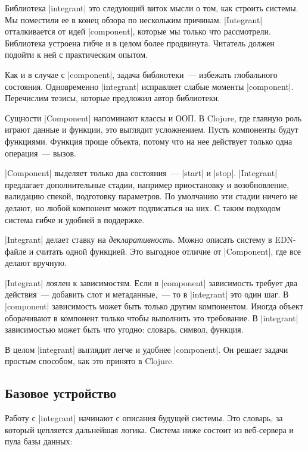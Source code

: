 Библиотека \spverb|integrant|
это следующий виток мысли о том, как строить системы. Мы поместили ее в конец
обзора по нескольким причинам. \spverb|Integrant| отталкивается от идей
\spverb|component|, которые мы только что рассмотрели. Библиотека устроена гибче
и в целом более продвинута. Читатель должен подойти к ней с практическим опытом.

Как и в случае с \spverb|component|, задача библиотеки~--- избежать глобального
состояния. Одновременно \spverb|integrant| исправляет слабые моменты
\spverb|component|. Перечислим тезисы, которые предложил автор библиотеки.

Сущности \spverb|Component| напоминают классы и ООП. В Clojure, где главную роль
играют данные и функции, это выглядит усложнением. Пусть компоненты будут
функциями. Функция проще объекта, потому что на нее действует только одна
операция~--- вызов.

\spverb|Component| выделяет только два состояния~--- \spverb|start| и
\spverb|stop|. \spverb|Integrant| предлагает дополнительные стадии, например
приостановку и возобновление, валидацию спекой, подготовку параметров. По
умолчанию эти стадии ничего не делают, но любой компонент может подписаться на
них. С таким подходом система гибче и удобней в поддержке.

\spverb|Integrant| делает ставку на \emph{декларативность}. Можно описать
систему в EDN-файле и считать одной функцией. Это выгодное отличие от
\spverb|Component|, где все делают вручную.

\spverb|Integrant| лоялен к зависимостям. Если в \spverb|component| зависимость
требует два действия~--- добавить слот и метаданные,~--- то в \spverb|integrant|
это один шаг. В \spverb|component| зависимость может быть только другим
компонентом. Иногда объект оборачивают в компонент только чтобы выполнить это
требование. В \spverb|integrant| зависимостью может быть что угодно: словарь,
символ, функция.

В целом \spverb|integrant| выглядит легче и удобнее \spverb|component|. Он
решает задачи простым способом, как это принято в Clojure.

\subsection{Базовое устройство}

Работу с \spverb|integrant| начинают с описания будущей системы. Это словарь, за
который цепляется дальнейшая логика. Система ниже состоит из веб-сервера и пула
базы данных:

